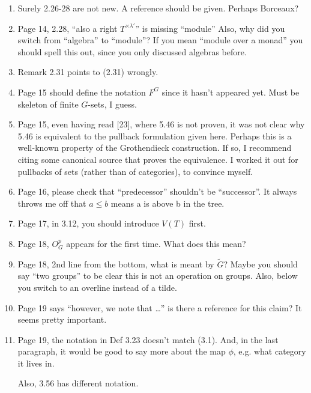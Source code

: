 \documentclass{article}
\begin{document}
\begin{enumerate}
\item
Surely 2.26-28 are not new. A reference should be given. Perhaps Borceaux?

\item
Page 14, 2.28, ``also a right $T^{\times \lambda'}$'' is missing ``module''
Also, why did you switch from ``algebra'' to ``module''? If you mean ``module over a monad'' you should spell this out, since you only discussed algebras before.

\item
Remark 2.31 points to (2.31) wrongly.



\item
Page 15 should define the notation $F^G$ since it hasn't appeared yet. Must be skeleton of finite $G$-sets, I guess.


\item
Page 15, even having read [23], where 5.46 is not proven, it was not clear why 5.46 is equivalent to the pullback formulation given here. Perhaps this is a well-known property of the Grothendieck construction. If so, I recommend citing some canonical source that proves the equivalence. I worked it out for pullbacks of sets (rather than of categories), to convince myself.

\item
Page 16, please check that ``predecessor'' shouldn't be ``successor''. It always throws me off that $a \leq b$ means a is above b in the tree.

\item
Page 17, in 3.12, you should introduce $V(T)$ first. 


\item
Page 18, $O_G^p$ appears for the first time. What does this mean?

\item
Page 18, 2nd line from the bottom, what is meant by $\tilde{G}$? Maybe you should say ``two groups'' to be clear this is not an operation on groups. Also, below you switch to an overline instead of a tilde.

\item
Page 19 says ``however, we note that \dots'' is there a reference for this claim? It seems pretty important.

\item
Page 19, the notation in Def 3.23 doesn't match (3.1). And, in the last paragraph, it would be good to say more about the map $\phi$, e.g. what category it lives in.

Also, 3.56 has different notation.


\end{enumerate}
\end{document}
